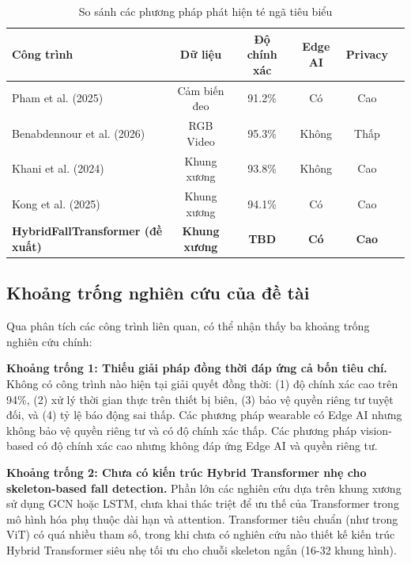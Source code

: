 \begin{table}[h]
\centering
\caption{So sánh các phương pháp phát hiện té ngã tiêu biểu}
\label{tab:related_works_comparison}
\begin{tabular}{|l|c|c|c|c|c|}
\hline
\textbf{Công trình} & \textbf{Dữ liệu} & \textbf{Độ chính xác} & \textbf{Edge AI} & \textbf{Privacy} \\
\hline
Pham et al. (2025) \cite{pham2025lightweight} & Cảm biến đeo & 91.2\% & Có & Cao \\
\hline
Benabdennour et al. (2026) \cite{benabdennour2026real} & RGB Video & 95.3\% & Không & Thấp \\
\hline
Khani et al. (2024) \cite{khani2024skeleton} & Khung xương & 93.8\% & Không & Cao \\
\hline
Kong et al. (2025) \cite{kong2025pifr} & Khung xương & 94.1\% & Có & Cao \\
\hline
\textbf{HybridFallTransformer (đề xuất)} & \textbf{Khung xương} & \textbf{TBD} & \textbf{Có} & \textbf{Cao} \\
\hline
\end{tabular}
\end{table}

\subsection{Khoảng trống nghiên cứu của đề tài}
\label{sec:research_gap}

Qua phân tích các công trình liên quan, có thể nhận thấy ba khoảng trống nghiên cứu chính:

\textbf{Khoảng trống 1: Thiếu giải pháp đồng thời đáp ứng cả bốn tiêu chí.} Không có công trình nào hiện tại giải quyết đồng thời: (1) độ chính xác cao trên 94\%, (2) xử lý thời gian thực trên thiết bị biên, (3) bảo vệ quyền riêng tư tuyệt đối, và (4) tỷ lệ báo động sai thấp. Các phương pháp wearable có Edge AI nhưng không bảo vệ quyền riêng tư và có độ chính xác thấp. Các phương pháp vision-based có độ chính xác cao nhưng không đáp ứng Edge AI và quyền riêng tư.

\textbf{Khoảng trống 2: Chưa có kiến trúc Hybrid Transformer nhẹ cho skeleton-based fall detection.} Phần lớn các nghiên cứu dựa trên khung xương sử dụng GCN hoặc LSTM, chưa khai thác triệt để ưu thế của Transformer trong mô hình hóa phụ thuộc dài hạn và attention. Transformer tiêu chuẩn (như trong ViT) có quá nhiều tham số, trong khi chưa có nghiên cứu nào thiết kế kiến trúc Hybrid Transformer siêu nhẹ tối ưu cho chuỗi skeleton ngắn (16-32 khung hình).

